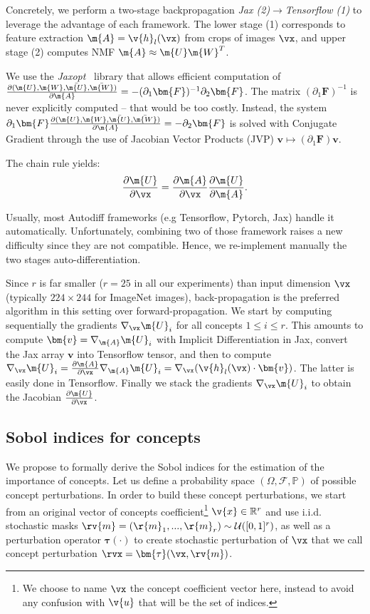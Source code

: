 Concretely, we perform a two-stage backpropagation \textit{Jax (2)}$\to$\textit{Tensorflow (1)} to leverage the advantage of each framework. The lower stage (1) corresponds to feature extraction $\m{A}=\v{h}_l(\vx)$ from crops of images $\vx$, and upper stage (2) computes NMF $\m{A} \approx \m{U}\m{W}^T$.  
  
We use the \textit{Jaxopt}~\cite{blondel2021implicitdiff} library that allows efficient computation of $\frac{\partial (\m{U},\m{W},\bar{\m{U}},\bar{\m{W}})}{\partial \m{A}}=-(\partial_1 \bm{F})^{-1}\partial_2 \bm{F}$. The matrix $(\partial_1 \bm{F})^{-1}$ is never explicitly computed -- that would be too costly. Instead, the system $\partial_1 \bm{F}\frac{\partial (\m{U},\m{W},\bar{\m{U}},\bar{\m{W}})}{\partial \m{A}}=-\partial_2 \bm{F}$ is solved with Conjugate Gradient through the use of Jacobian Vector Products (JVP) $\bm{v}\mapsto (\partial_1 \bm{F})\bm{v}$.  
  
The chain rule yields:
$$\frac{\partial \m{U}}{\partial \vx}=\frac{\partial \m{A}}{\partial \vx}\frac{\partial \m{U}}{\partial \m{A}}.$$

Usually, most Autodiff frameworks (e.g Tensorflow, Pytorch, Jax) handle it automatically. Unfortunately, combining two of those framework raises a new difficulty since they are not compatible. Hence, we re-implement manually the two stages auto-differentiation.  
  
Since $r$ is far smaller ($r=25$ in all our experiments) than input dimension $\vx$ (typically $224\times 244$ for ImageNet images), back-propagation is the preferred algorithm in this setting over forward-propagation. We start by computing sequentially the gradients $\nabla_{\vx} \m{U}_i$ for all concepts $1\leq i\leq r$. This amounts to compute $\bm{v}=\nabla_{\m{A}} \m{U}_i$ with Implicit Differentiation in Jax, convert the Jax array $\bm{v}$ into Tensorflow tensor, and then to compute $\nabla_{\vx} \m{U}_i=\frac{\partial \m{A}}{\partial \vx}\nabla_{\m{A}} \m{U}_i=\nabla_{\vx} (\v{h}_l(\vx) \cdot \bm{v})$. The latter is easily done in Tensorflow. Finally we stack the gradients $\nabla_{\vx} \m{U}_i$ to obtain the Jacobian $\frac{\partial \m{U}}{\partial \vx}$.



\subsection{Sobol indices for concepts} \label{apdx:sobol}

We propose to formally derive the Sobol indices for the estimation of the importance of concepts.
Let us define a probability space  $(\Omega, \mathcal{F}, \mathbb{P})$ of possible concept perturbations. In order to build these concept perturbations, we start from an original vector of concepts coefficient\footnote{We choose to name $\vx$ the concept coefficient vector here, instead to avoid any confusion with $\v{u}$ that will be the set of indices.} $\v{x} \in \mathbb{R}^r$ and use i.i.d. stochastic masks $\rv{m} = (\r{m}_1, ..., \r{m}_r) \sim \mathcal{U}([0, 1]^r)$, as well as a perturbation operator $\bm{\tau}(\cdot)$ to create stochastic perturbation of $\vx$ that we call concept perturbation $\rvx = \bm{\tau}(\vx, \rv{m})$. 


